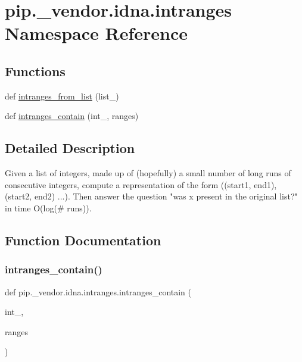 \hypertarget{namespacepip_1_1__vendor_1_1idna_1_1intranges}{}\section{pip.\+\_\+vendor.\+idna.\+intranges Namespace Reference}
\label{namespacepip_1_1__vendor_1_1idna_1_1intranges}
\subsection*{Functions}
\begin{DoxyCompactItemize}
\item 
def \hyperlink{namespacepip_1_1__vendor_1_1idna_1_1intranges_a418221786b0d94e50db7779ad9ea5735}{intranges\+\_\+from\+\_\+list} (list\+\_\+)
\item 
def \hyperlink{namespacepip_1_1__vendor_1_1idna_1_1intranges_abcdc067f2c261e1663789054ba59f597}{intranges\+\_\+contain} (int\+\_\+, ranges)
\end{DoxyCompactItemize}


\subsection{Detailed Description}
\begin{DoxyVerb}Given a list of integers, made up of (hopefully) a small number of long runs
of consecutive integers, compute a representation of the form
((start1, end1), (start2, end2) ...). Then answer the question "was x present
in the original list?" in time O(log(# runs)).
\end{DoxyVerb}
 

\subsection{Function Documentation}
\mbox{\label{namespacepip_1_1__vendor_1_1idna_1_1intranges_abcdc067f2c261e1663789054ba59f597}} 
\subsubsection{\texorpdfstring{intranges\+\_\+contain()}{intranges\_contain()}}
{\footnotesize\ttfamily def pip.\+\_\+vendor.\+idna.\+intranges.\+intranges\+\_\+contain (\begin{DoxyParamCaption}\item[{}]{int\+\_\+,  }\item[{}]{ranges }\end{DoxyParamCaption})}

